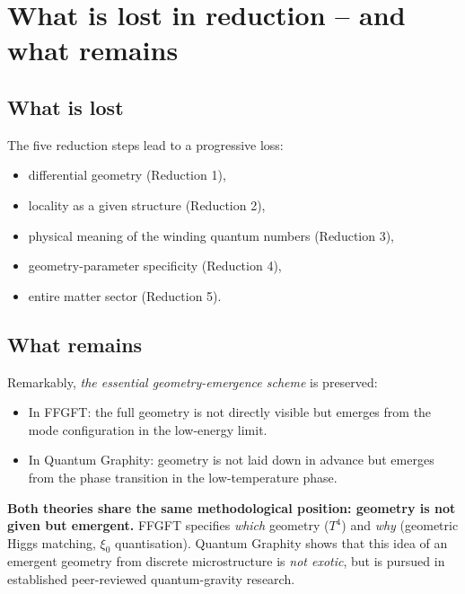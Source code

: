 \section{What is lost in reduction -- and what remains}

\subsection{What is lost}

The five reduction steps lead to a progressive loss:
\begin{itemize}[leftmargin=2em,itemsep=2pt,topsep=2pt]
  \item differential geometry (Reduction 1),
  \item locality as a given structure (Reduction 2),
  \item physical meaning of the winding quantum numbers
        (Reduction 3),
  \item geometry-parameter specificity (Reduction 4),
  \item entire matter sector (Reduction 5).
\end{itemize}

\subsection{What remains}

Remarkably, \emph{the essential geometry-emergence scheme} is
preserved:
\begin{itemize}[leftmargin=2em,itemsep=2pt,topsep=2pt]
  \item In FFGFT: the full geometry is not directly visible but
        emerges from the mode configuration in the low-energy limit.
  \item In Quantum Graphity: geometry is not laid down in advance
        but emerges from the phase transition in the low-temperature
        phase.
\end{itemize}

\textbf{Both theories share the same methodological position:
geometry is not given but emergent.} FFGFT specifies \emph{which}
geometry ($T^4$) and \emph{why} (geometric Higgs matching,
$\xi_0$ quantisation). Quantum Graphity shows that this idea of an
emergent geometry from discrete microstructure is \emph{not exotic},
but is pursued in established peer-reviewed quantum-gravity research.

